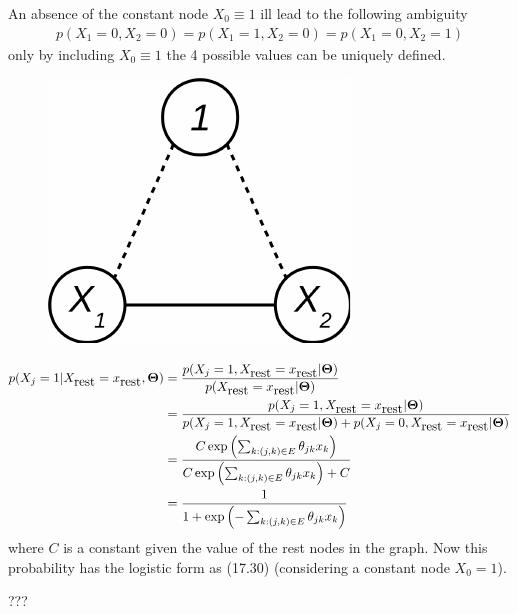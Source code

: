 \begin{exercise}
  An absence of the constant node $X_0 \equiv 1$ ill lead to the following
  ambiguity
  \begin{align}
    p(X_1=0, X_2=0) = p(X_1=1, X_2=0) = p(X_1=0, X_2=1)
  \end{align}
  only by including $X_0 \equiv 1$ the 4 possible values can be uniquely
  defined. \begin{figure}[htb]
      \centering
      \includegraphics[width=0.15\columnwidth]{./figs/17_10.pdf}
      \label{fig:chap_17_10}
    \end{figure}
\end{exercise}

\begin{exercise}
  \begin{align}
    p(X_j=1|X_{\mbox{rest}} = x_{\mbox{rest}}, \mathbf{\Theta}) &=
    \frac{p(X_j=1,X_{\mbox{rest}} = x_{\mbox{rest}} |
    \mathbf{\Theta})}{p(X_{\mbox{rest}} = x_{\mbox{rest}} | \mathbf{\Theta})}
    \notag \\
    &= \frac{p(X_j=1,X_{\mbox{rest}} = x_{\mbox{rest}} |
    \mathbf{\Theta})} {p(X_j=1, X_{\mbox{rest}} = x_{\mbox{rest}} |
    \mathbf{\Theta}) + p(X_j=0, X_{\mbox{rest}} = x_{\mbox{rest}} |
    \mathbf{\Theta})} \notag \\
    &= \frac{C\exp\left(\sum_{k:(j,k)\in
    E}\theta_{jk}x_k\right)}{C\exp\left(\sum_{k:(j,k)\in E}\theta_{jk}x_k\right)
    + C} \notag \\
    &= \frac{1} 
    {1 + \exp\left(-\sum_{k:(j,k)\in E}\theta_{jk}x_k\right)}
  \end{align}
  where $C$ is a constant given the value of the rest nodes in the graph. Now
  this probability has the logistic form as (17.30) (considering a
  constant node $X_0=1$).
\end{exercise}

\begin{exercise}
  ???
\end{exercise}